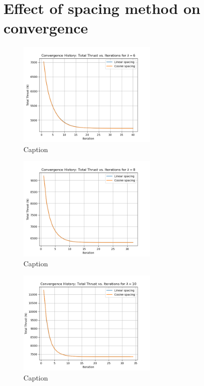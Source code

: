 \section{Effect of spacing method on convergence}
\begin{figure}[H]
    \centering
    \includegraphics[width=0.6\textwidth]{Figures/Spacing_method_6.png}
    \caption{Caption}
    \label{fig:enter-label}
\end{figure}
\begin{figure}[H]
    \centering
    \includegraphics[width=0.6\textwidth]{Figures/spacing_method_8.png}
    \caption{Caption}
    \label{fig:enter-label}
\end{figure}
\begin{figure}[H]
    \centering
    \includegraphics[width=0.6\textwidth]{Figures/spacing_method_10.png}
    \caption{Caption}
    \label{fig:enter-label}
\end{figure}